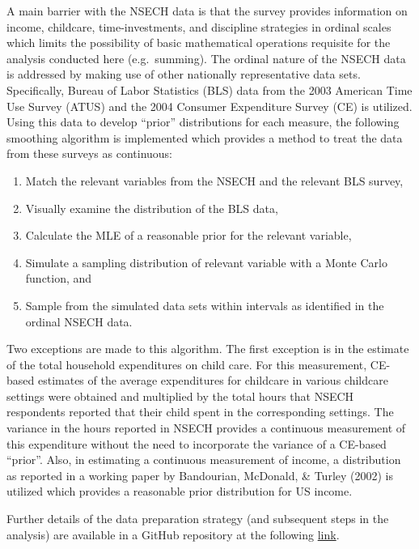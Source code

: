 A main barrier with the NSECH data is that the survey provides
information on income, childcare, time-investments, and discipline
strategies in ordinal scales which limits the possibility of basic
mathematical operations requisite for the analysis conducted here
(e.g.~summing). The ordinal nature of the NSECH data is addressed by
making use of other nationally representative data sets. Specifically,
Bureau of Labor Statistics (BLS) data from the 2003 American Time Use
Survey (ATUS) and the 2004 Consumer Expenditure Survey (CE) is utilized.
Using this data to develop ``prior'' distributions for each measure, the
following smoothing algorithm is implemented which provides a method to
treat the data from these surveys as continuous:

\begin{enumerate}
\def\labelenumi{\arabic{enumi}.}
\itemsep1pt\parskip0pt
\item
  Match the relevant variables from the NSECH and the relevant BLS
  survey,
\item
  Visually examine the distribution of the BLS data,
\item
  Calculate the MLE of a reasonable prior for the relevant variable,
\item
  Simulate a sampling distribution of relevant variable with a Monte
  Carlo function, and
\item
  Sample from the simulated data sets within intervals as identified in
  the ordinal NSECH data.
\end{enumerate}

Two exceptions are made to this algorithm. The first exception is in the
estimate of the total household expenditures on child care. For this
measurement, CE-based estimates of the average expenditures for
childcare in various childcare settings were obtained and multiplied by
the total hours that NSECH respondents reported that their child spent
in the corresponding settings. The variance in the hours reported in
NSECH provides a continuous measurement of this expenditure without the
need to incorporate the variance of a CE-based ``prior''. Also, in
estimating a continuous measurement of income, a distribution as
reported in a working paper by Bandourian, McDonald, \& Turley (2002) is
utilized which provides a reasonable prior distribution for US income.

Further details of the data preparation strategy (and subsequent steps
in the analysis) are available in a GitHub repository at the following \href{https://github.com/mienkoja/qualpaper}{link}.


